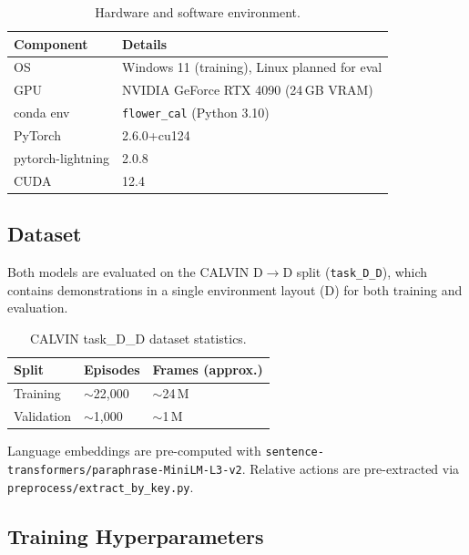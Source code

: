 \documentclass[11pt,a4paper]{article}
\begin{document}
\begin{table}[h]
\centering
\begin{tabular}{ll}
\toprule
\textbf{Component} & \textbf{Details} \\
\midrule
OS          & Windows 11 (training), Linux planned for eval \\
GPU         & NVIDIA GeForce RTX 4090 (24\,GB VRAM) \\
conda env   & \texttt{flower\_cal} (Python 3.10) \\
PyTorch     & 2.6.0+cu124 \\
pytorch-lightning & 2.0.8 \\
CUDA        & 12.4 \\
\bottomrule
\end{tabular}
\caption{Hardware and software environment.}
\label{tab:env}
\end{table}

\subsection{Dataset}

Both models are evaluated on the CALVIN D$\rightarrow$D split
(\texttt{task\_D\_D}), which contains demonstrations in a single environment
layout (D) for both training and evaluation.

\begin{table}[h]
\centering
\begin{tabular}{lll}
\toprule
\textbf{Split} & \textbf{Episodes} & \textbf{Frames (approx.)} \\
\midrule
Training   & $\sim$22{,}000 & $\sim$24\,M \\
Validation & $\sim$1{,}000  & $\sim$1\,M  \\
\bottomrule
\end{tabular}
\caption{CALVIN task\_D\_D dataset statistics.}
\label{tab:dataset}
\end{table}

Language embeddings are pre-computed with
\texttt{sentence-transformers/paraphrase-MiniLM-L3-v2}.
Relative actions are pre-extracted via \texttt{preprocess/extract\_by\_key.py}.

\subsection{Training Hyperparameters}
\end{document}
